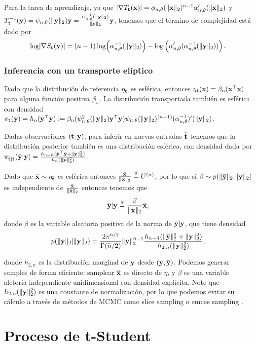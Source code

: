Para la tarea de aprendizaje, ya que \(\left\vert \nabla T_{\mathbf{t}}(\mathbf{x}) \right\vert = \phi_{n,\theta}(\lVert \mathbf{x} \rVert_2)^{n-1}\alpha_{n,\theta}'(\lVert \mathbf{x} \rVert_2)\) y  \(T_{\mathbf{t}}^{-1}(\mathbf{y}) = \psi_{n,\theta}(\lVert \mathbf{y} \rVert_2)\mathbf{y}  = \frac{\alpha^{-1}_{n,\theta}(\lVert \mathbf{y} \rVert_2) }{\lVert \mathbf{y} \rVert_2}\mathbf{y}\), tenemos que el término de complejidad está dado por \[\log \lvert  \nabla S_{\mathbf{t}}(\mathbf{y}) \rvert = (n-1)\log(\alpha_{n,\theta}^{-1}(\lVert \mathbf{y} \rVert_2)) -\log\left(\alpha_{n,\theta}'(\alpha_{n,\theta}^{-1}(\lVert \mathbf{y} \rVert_2))\right).\]

\subsubsection{Inferencia con un transporte elíptico}
Dado que la distribución de referencia \(\eta_{\mathbf{t}}\) es esférica, entonces \(\eta_{\mathbf{t}}(\mathbf{x}) = \beta_n(\mathbf{x}^\top \mathbf{x})\) para alguna función positiva \(\beta_n\). La distribución transportada también es esférica con densidad \(\pi_{\mathbf{t}}(\mathbf{y})=h_{n}(\mathbf{y}^\top\mathbf{y}) := \beta_n(\psi_{n,\theta}^2(\lVert \mathbf{y} \rVert_2)\mathbf{y}^\top\mathbf{y})\psi_{n,\theta}(\lVert \mathbf{y} \rVert_2)^{(n-1)}(\alpha_{n,\theta}^{-1})'(\lVert \mathbf{y} \rVert_2)\). 

Dadas observaciones \((\mathbf{t},\mathbf{y})\), para inferir en nuevas entradas \(\bar{\mathbf{t}}\) tenemos que la distribución posterior también es una distribución esférica, con densidad dada por  \(\pi_{\bar{\mathbf{t}}|\mathbf{t}}(\bar{\mathbf{y}}|\mathbf{y})=\frac{h_{n+\bar{n}}(\bar{\mathbf{y}}^\top\bar{\mathbf{y}} + \lVert \mathbf{y} \rVert_2^2)}{h_{n}(\lVert \mathbf{y} \rVert_2^2)}\). 

Dado que \(\bar{\mathbf{x}} \sim \eta_{\bar{\mathbf{t}}}\) es esférica entonces \(\frac{\bar{\mathbf{x}}}{\lVert \bar{\mathbf{x}} \rVert_2} \stackrel{d}{=} U^{(\bar{n})}\), por lo que si \(\beta \sim p(\lVert \bar{\mathbf{y}} \rVert_2|\lVert \mathbf{y} \rVert_2) \) es independiente de \(\frac{\bar{\mathbf{x}}}{\lVert \bar{\mathbf{x}} \rVert_2}\) entonces tenemos que 
\[\bar{\mathbf{y}}|\mathbf{y} \stackrel{d}{=} \frac{ \beta }{\lVert \bar{\mathbf{x}} \rVert_2} \bar{\mathbf{x}},\]
donde \(\beta\) es la variable aleatoria positiva de la norma de \(\bar{\mathbf{y}}|\mathbf{y}\), que tiene densidad \[p(\lVert \bar{\mathbf{y}} \rVert_2|\lVert \mathbf{y} \rVert_2) = \frac{2\pi^{\bar{n}/2}}{\Gamma(\bar{n}/2)}\lVert \bar{\mathbf{y}} \rVert_2^{\bar{n}-1}\frac{h_{n+\bar{n}}(\lVert \bar{\mathbf{y}} \rVert_2^2 + \lVert \mathbf{y} \rVert_2^2) }{h_{2,n}(\lVert \mathbf{y} \rVert_2^2)},\]

donde \(h_{2,n}\) es la distribución marginal de \(\mathbf{y}\) desde \((\mathbf{y},\bar{\mathbf{y}})\). Podemos generar samples de forma eficiente: samplear \(\bar{\mathbf{x}}\) es directo de \(\eta\), y \(\beta\) es una variable aletoria independiente unidimensional con densidad explícita. Note que \(h_{2,n}(\lVert \mathbf{y} \rVert_2^2)\) es una constante de normalización, por lo que podemos evitar su cálculo a través de métodos de MCMC como slice sampling o emcee sampling \cite{brooks2011handbook,neal2003slice,foreman2013emcee}.

\section{Proceso de t-Student}


